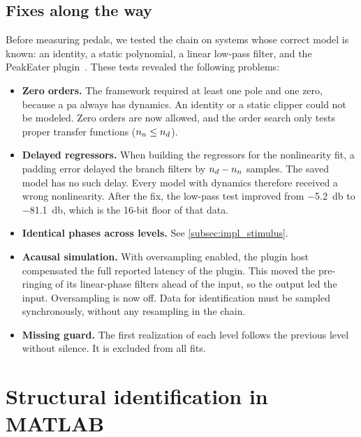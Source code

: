 \subsection{Fixes along the way}
\label{subsec:impl_fixes}

Before measuring pedals, we tested the chain on systems whose correct model is known: an identity, a static polynomial, a linear low-pass filter, and the PeakEater plugin~\cite{peakeater}. These tests revealed the following problems:
\begin{itemize}
  \item \textbf{Zero orders.} The framework required at least one pole and one zero, because a \gls{pa} always has dynamics. An identity or a static clipper could not be modeled. Zero orders are now allowed, and the order search only tests proper transfer functions ($n\sb{n} \leq n\sb{d}$).
  \item \textbf{Delayed regressors.} When building the regressors for the nonlinearity fit, a padding error delayed the branch filters by $n\sb{d} - n\sb{n}$ samples. The saved model has no such delay. Every model with dynamics therefore received a wrong nonlinearity. After the fix, the low-pass test improved from \SI{-5.2}{\decibel} to \SI{-81.1}{\decibel}, which is the 16-bit floor of that data.
  \item \textbf{Identical phases across levels.} See \cref{subsec:impl_stimulus}.
  \item \textbf{Acausal simulation.} With oversampling enabled, the plugin host compensated the full reported latency of the plugin. This moved the pre-ringing of its linear-phase filters ahead of the input, so the output led the input. Oversampling is now off. Data for identification must be sampled synchronously, without any resampling in the chain.
  \item \textbf{Missing guard.} The first realization of each level follows the previous level without silence. It is excluded from all fits.
\end{itemize}


\section{Structural identification in MATLAB}
\label{sec:impl_matlab}

